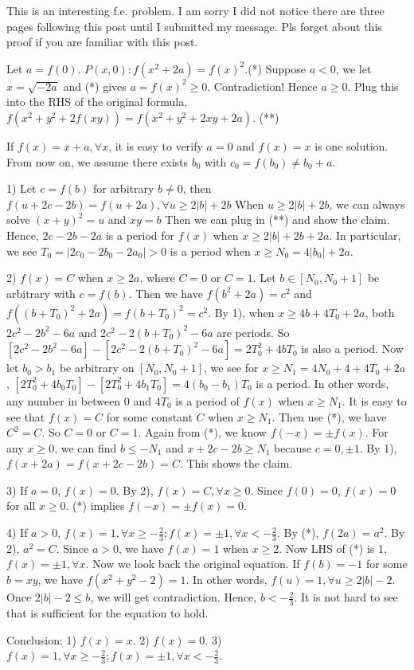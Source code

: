 \begin{solution}
	This is an interesting f.e. problem. 
I am sorry I did not notice there are three pages following this post until I submitted my message. Pls forget about this proof if you are familiar with this post.

Let $ a = f(0)$.
$ P(x,0): f(x^2 + 2a) = f(x)^2$.(*)
Suppose $ a < 0$, we let $ x = \sqrt { - 2a}$ and (*) gives $ a = f(x)^2\ge0$. Contradiction!
Hence $ a\ge0$.
Plug this into the RHS of the original formula,
$ f(x^2 + y^2 + 2f(xy)) = f(x^2 + y^2 + 2xy + 2a)$. (**)

If $ f(x) = x + a,\forall x$, it is easy to verify $ a = 0$ and $ f(x) = x$ is one solution.
From now on, we assume there exists $ b_0$ with $ c_0 = f(b_0)\ne b_0 + a$.

1) Let $ c = f(b)$ for arbitrary $ b\ne0$, then $ f(u + 2c - 2b) = f(u + 2a),\forall u\ge 2|b| + 2b$
When $ u\ge 2|b| + 2b$, we can always solve $ (x + y)^2 = u$ and $ xy = b$
Then we can plug in (**) and show the claim.
Hence, $ 2c - 2b - 2a$ is a period for $ f(x)$ when $ x\ge 2|b| + 2b + 2a$.
In particular, we see $ T_0 = |2c_0 - 2b_0 - 2a_0| > 0$ is a period when $ x\ge N_0 = 4|b_0| + 2a$.

2) $ f(x) = C$ when $ x\ge2a$, where $ C = 0$ or $ C = 1$.
Let $ b\in [N_0,N_0 + 1]$ be arbitrary with $ c = f(b)$. 
Then we have $ f(b^2 + 2a) = c^2$ and $ f((b + T_0)^2 + 2a) = f(b + T_0)^2 = c^2$.
By 1), when $ x\ge 4b + 4T_0 + 2a$, both $ 2c^2 - 2b^2 - 6a$ and $ 2c^2 - 2(b + T_0)^2 - 6a$ are periods.
So $ [2c^2 - 2b^2 - 6a] - [ 2c^2 - 2(b + T_0)^2 - 6a] = 2T_0^2 + 4bT_0$ is also a period.
Now let $ b_0 > b_1$ be arbitrary on $ [N_0,N_0 + 1]$, we see for $ x \ge N_1 = 4N_0 + 4 + 4T_0 + 2a$,
$ [ 2T_0^2 + 4b_0T_0] - [ 2T_0^2 + 4b_1T_0] = 4(b_0 - b_1)T_0$ is a period.
In other words, any number in between $ 0$ and $ 4T_0$ is a period of $ f(x)$ when $ x \ge N_1$.
It is easy to see that $ f(x) = C$ for some constant $ C$ when $ x\ge N_1$.
Then use (*), we have $ C^2 = C$. So $ C = 0$ or $ C = 1$.
Again from (*), we know $ f( - x) = \pm f(x)$.
For any $ x\ge0$, we can find $ b\le - N_1$ and $ x + 2c - 2b\ge N_1$ because $ c = 0,\pm1$.
By 1), $ f(x + 2a) = f(x + 2c - 2b) = C$. This shows the claim.

3) If $ a = 0$, $ f(x) = 0$.
By 2), $ f(x) = C,\forall x\ge0$. Since $ f(0) = 0$, $ f(x) = 0$ for all $ x\ge0$. (*) implies $ f( - x) = \pm f(x) = 0$.

4) If $ a > 0$, $ f(x) = 1,\forall x\ge - \frac23;f(x) = \pm1,\forall x < - \frac23$.
By (*), $ f(2a) = a^2$. By 2), $ a^2 = C$. Since $ a > 0$, we have $ f(x) = 1$ when $ x\ge2$.
Now LHS of (*) is 1,  $ f(x) = \pm 1,\forall x$.
Now we look back the original equation. 
If $ f(b) = - 1$ for some $ b = xy$, we have $ f(x^2 + y^2 - 2) = 1$. 
In other words, $ f(u) = 1,\forall u\ge2|b| - 2$.
Once $ 2|b| - 2\le b$, we will get contradiction.
Hence, $ b < - \frac23$. It is not hard to see that is sufficient for the equation to hold.

Conclusion:
1) $ f(x) = x$.
2) $ f(x) = 0$.
3) $ f(x) = 1,\forall x\ge - \frac23;f(x) = \pm1,\forall x < - \frac23$.
\end{solution}
